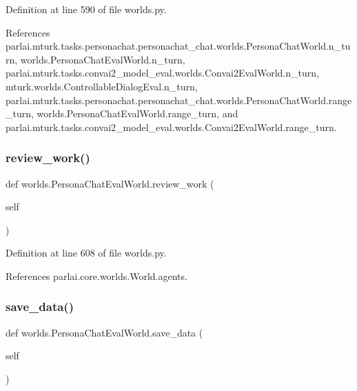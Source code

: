 Definition at line 590 of file worlds.\+py.



References parlai.\+mturk.\+tasks.\+personachat.\+personachat\+\_\+chat.\+worlds.\+Persona\+Chat\+World.\+n\+\_\+turn, worlds.\+Persona\+Chat\+Eval\+World.\+n\+\_\+turn, parlai.\+mturk.\+tasks.\+convai2\+\_\+model\+\_\+eval.\+worlds.\+Convai2\+Eval\+World.\+n\+\_\+turn, mturk.\+worlds.\+Controllable\+Dialog\+Eval.\+n\+\_\+turn, parlai.\+mturk.\+tasks.\+personachat.\+personachat\+\_\+chat.\+worlds.\+Persona\+Chat\+World.\+range\+\_\+turn, worlds.\+Persona\+Chat\+Eval\+World.\+range\+\_\+turn, and parlai.\+mturk.\+tasks.\+convai2\+\_\+model\+\_\+eval.\+worlds.\+Convai2\+Eval\+World.\+range\+\_\+turn.

\mbox{\label{classworlds_1_1PersonaChatEvalWorld_aaba9e31d1918785215499ddaadf8a91d}} 
\subsubsection{\texorpdfstring{review\+\_\+work()}{review\_work()}}
{\footnotesize\ttfamily def worlds.\+Persona\+Chat\+Eval\+World.\+review\+\_\+work (\begin{DoxyParamCaption}\item[{}]{self }\end{DoxyParamCaption})}



Definition at line 608 of file worlds.\+py.



References parlai.\+core.\+worlds.\+World.\+agents.

\mbox{\label{classworlds_1_1PersonaChatEvalWorld_a854ebcf8c0781f58a296fde2c7db80c9}} 
\subsubsection{\texorpdfstring{save\+\_\+data()}{save\_data()}}
{\footnotesize\ttfamily def worlds.\+Persona\+Chat\+Eval\+World.\+save\+\_\+data (\begin{DoxyParamCaption}\item[{}]{self }\end{DoxyParamCaption})}



